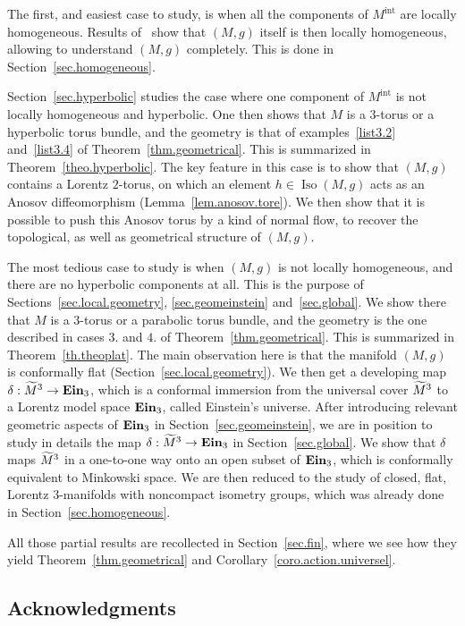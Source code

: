 \documentclass[11pt]{article}
\theoremstyle{definition}
\numberwithin{equation}{section}
\numberwithin{figure}{section}
\numberwithin{table}{section}
\DeclareMathOperator{\Iso}{Iso}
\DeclareMathOperator{\ein}{{\bf Ein}_3}
\newcommand{\mint}{{M^{\intl}}}
\DeclareMathOperator{\intl}{int}
\let\oldtilde\tilde
\renewcommand*\tilde[1]{\mathchoice{\widetilde{#1}}{\widetilde{#1}}{\widetilde{#1}}{\oldtilde{#1}}}
\begin{document}
The first, and easiest case to study, is when all the components of $\mint$ are locally homogeneous. Results of~\cite{frances.open} show that $(M,g)$ itself is then locally homogeneous, allowing to understand $(M,g)$ completely. This is done in Section~\ref{sec.homogeneous}.

Section~\ref{sec.hyperbolic} studies the case where one component of $\mint$ is not locally homogeneous and hyperbolic. One then shows that $M$ is a $3$-torus or a hyperbolic torus bundle, and the geometry is that of examples~\eqref{list3.2} and~\eqref{list3.4} of Theorem~\ref{thm.geometrical}. This is summarized in Theorem~\ref{theo.hyperbolic}. The key feature in this case is to show that $(M,g)$ contains a Lorentz $2$-torus, on which an element $h \in \Iso(M,g)$ acts as an Anosov diffeomorphism (Lemma~\ref{lem.anosov.tore}). We then show that it is possible to push this Anosov torus by a kind of normal flow, to recover the topological, as well as geometrical structure of $(M,g)$.

The most tedious case to study is when $(M,g)$ is not locally homogeneous, and there are no hyperbolic components at all. This is the purpose of Sections~\ref{sec.local.geometry}, \ref{sec.geomeinstein} and~\ref{sec.global}. We show there that $M$ is a $3$-torus or a parabolic torus bundle, and the geometry is the one described in cases $3.$ and $4.$ of Theorem~\ref{thm.geometrical}. This is summarized in Theorem~\ref{th.theoplat}. The main observation here is that the manifold $(M,g)$ is conformally flat (Section~\ref{sec.local.geometry}). We then get a developing map $\delta: \tilde{M}^3 \to \ein$, which is a conformal immersion from the universal cover $\tilde{M}^3$ to a Lorentz model space $\ein$, called Einstein's universe. After introducing relevant geometric aspects of $\ein$ in Section~\ref{sec.geomeinstein}, we are in position to study in details the map $\delta: \tilde{M}^3 \to \ein$ in Section~\ref{sec.global}. We show that $\delta$ maps $\tilde{M}^3$ in a one-to-one way onto an open subset of $\ein$, which is conformally equivalent to Minkowski space. We are then reduced to the study of closed, flat, Lorentz $3$-manifolds with noncompact isometry groups, which was already done in Section~\ref{sec.homogeneous}.

All those partial results are recollected in Section~\ref{sec.fin}, where we see how they yield Theorem~\ref{thm.geometrical} and Corollary~\ref{coro.action.universel}.

\subsection*{Acknowledgments}
\end{document}
